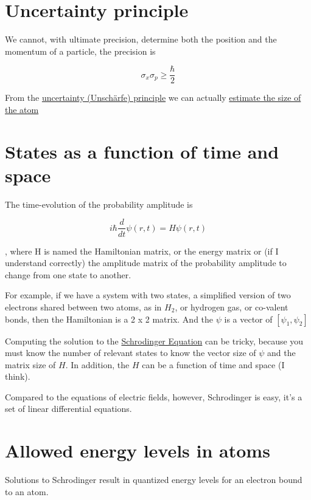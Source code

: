 \section{Uncertainty principle}\label{uncertainty-principle}

We cannot, with ultimate precision, determine both the position and the
momentum of a particle, the precision is

\[\sigma_x \sigma_p \ge \frac{\hbar}{2}\]

From the
\href{https://en.wikipedia.org/wiki/Uncertainty_principle}{uncertainty
(Unschärfe) principle} we can actually
\href{https://wulffern.github.io/aic2023/atom}{estimate the size of the
atom}

\section{States as a function of time and
space}\label{states-as-a-function-of-time-and-space}

The time-evolution of the probability amplitude is

\[ i\hbar \frac{d}{dt} \psi(r,t) = H \psi(r,t)\]

, where H is named the Hamiltonian matrix, or the energy matrix or (if I
understand correctly) the amplitude matrix of the probability amplitude
to change from one state to another.

For example, if we have a system with two states, a simplified version
of two electrons shared between two atoms, as in \(H_2\), or hydrogen
gas, or co-valent bonds, then the Hamiltonian is a 2 x 2 matrix. And the
\(\psi\) is a vector of \([\psi_1,\psi_2]\)

Computing the solution to the
\href{https://en.wikipedia.org/wiki/Schrödinger_equation}{Schrodinger
Equation} can be tricky, because you must know the number of relevant
states to know the vector size of \(\psi\) and the matrix size of \(H\).
In addition, the \(H\) can be a function of time and space (I think).

Compared to the equations of electric fields, however, Schrodinger is
easy, it's a set of linear differential equations.

\section{Allowed energy levels in
atoms}\label{allowed-energy-levels-in-atoms}

Solutions to Schrodinger result in quantized energy levels for an
electron bound to an atom.

